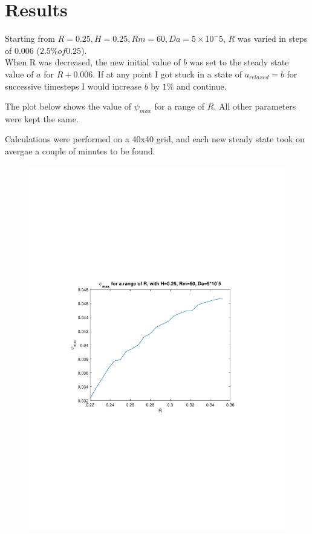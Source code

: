 \documentclass[11pt]{proc}
\begin{document}
\onecolumn

\section{Results}

Starting from $R=0.25, H=0.25, Rm=60, Da=5\times10^-5$, $R$ was varied in steps of $0.006$ ($2.5\% of 0.25$). \\

When R was decreased, the new initial value of $b$ was set to the steady state value of $a$ for $R+0.006$. If at any point I got stuck in a state of $a_{relaxed} = b$ for successive timesteps I would increase $b$ by $1\%$ and continue.

The plot below shows the value of $\psi_{max}$ for a range of $R$. All other parameters were kept the same.

Calculations were performed on a 40x40 grid, and each new steady state took on avergae a couple of minutes to be found.


\begin{figure}[h]
    \includegraphics{max_psi_function_of_R}
\end{figure}
\end{document}
